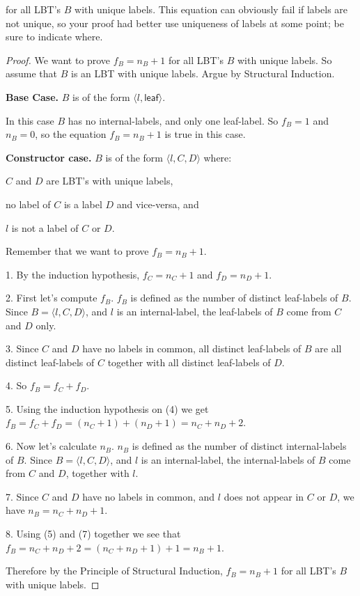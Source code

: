 \documentclass[14pt]{extarticle}
\begin{document}
for all LBT’s $B$ with unique labels. This equation can obviously fail if labels are not unique, so your proof had better use uniqueness of labels at some point; be sure to indicate where.
\begin{proof}
We want to prove $f_B = n_B + 1$ for all LBT's $B$ with unique labels. So assume that $B$ is an LBT with unique labels. Argue by Structural Induction.

\textbf{Base Case.} $B$ is of the form $\langle l, \mathsf{leaf}\rangle$.

In this case $B$ has no internal-labels, and only one leaf-label. So $f_B = 1$ and $n_B = 0$, so the equation $f_B = n_B+1$ is true in this case.

\textbf{Constructor case.} $B$ is of the form $\langle l, C, D \rangle$ where:

$C$ and $D$ are LBT’s with unique labels, 

no label of $C$ is a label $D$ and vice-versa, and 

$l$ is not a label of $C$ or $D$.

Remember that we want to prove $f_B = n_B+1$. 

1. By the induction hypothesis, $f_C = n_C+1$ and $f_D = n_D + 1$.

2. First let's compute $f_B$. $f_B$ is defined as the number of distinct leaf-labels of $B$. Since $B = \langle l, C, D \rangle$, and $l$ is an internal-label, the leaf-labels of $B$ come from $C$ and $D$ only. 

3. Since $C$ and $D$ have no labels in common, all distinct leaf-labels of $B$ are all distinct leaf-labels of $C$ together with all distinct leaf-labels of $D$.

4. So $f_B = f_C + f_D$. 

5. Using the induction hypothesis on (4) we get $f_B = f_C + f_D = (n_C + 1) + (n_D + 1) = n_C + n_D + 2$.

6. Now let's calculate $n_B$. $n_B$ is defined as the number of distinct internal-labels of $B$. Since $B = \langle l, C, D \rangle$, and $l$ is an internal-label, the internal-labels of $B$ come from $C$ and $D$, together with $l$.

7. Since $C$ and $D$ have no labels in common, and $l$ does not appear in $C$ or $D$, we have $n_B = n_C + n_D + 1$. 

8. Using (5) and (7) together we see that $f_B = n_C + n_D + 2 = (n_C + n_D + 1) + 1 = n_B + 1$.

Therefore by the Principle of Structural Induction, $f_B = n_B+1$ for all LBT's $B$ with unique labels.
\end{proof}
\end{document}
